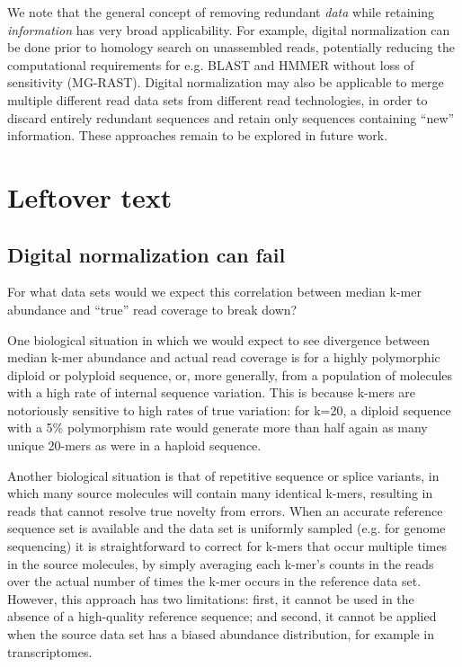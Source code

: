 \documentclass[10pt]{article}
\begin{document}
We note that the general concept of removing redundant {\em data}
while retaining {\em information} has very broad applicability.  For
example, digital normalization can be done prior to homology search on
unassembled reads, potentially reducing the computational requirements
for e.g. BLAST and HMMER without loss of sensitivity (MG-RAST).  Digital
normalization may also be applicable to merge multiple different read
data sets from different read technologies, in order to discard
entirely redundant sequences and retain only sequences containing
``new'' information.  These approaches remain to be explored in future
work.

\section*{Leftover text}

\subsection*{Digital normalization can fail}

For what data sets would we expect this correlation between median
k-mer abundance and ``true'' read coverage to break down?

One biological situation in which we would expect to see divergence
between median k-mer abundance and actual read coverage is for a
highly polymorphic diploid or polyploid sequence, or, more generally,
from a population of molecules with a high rate of internal sequence
variation.  This is because k-mers are notoriously sensitive to high
rates of true variation: for k=20, a diploid sequence with a 5\%
polymorphism rate would generate more than half again as many unique
20-mers as were in a haploid sequence.

Another biological situation is that of repetitive sequence or splice
variants, in which many source molecules will contain many identical
k-mers, resulting in reads that cannot resolve true novelty from errors.  When an accurate reference sequence set is available and the
data set is uniformly sampled (e.g. for genome sequencing) it is
straightforward to correct for k-mers that occur multiple times in the
source molecules, by simply averaging each k-mer's counts in the reads
over the actual number of times the k-mer occurs in the reference data
set.  However, this approach has two limitations: first, it cannot be
used in the absence of a high-quality reference sequence; and second,
it cannot be applied when the source data set has a biased abundance
distribution, for example in transcriptomes.
\end{document}

